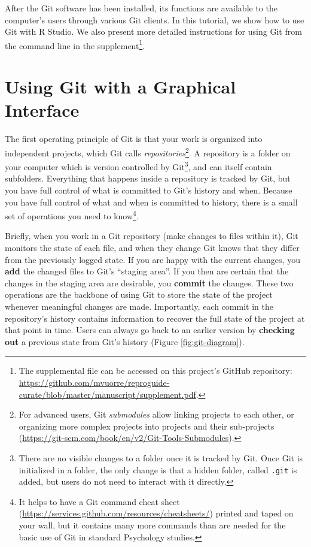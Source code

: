 \documentclass[
  american,
  ,doc,floatsintext]{apa6}
\begin{document}
After the Git software has been installed, its functions are available to the computer's users through various Git clients. In this tutorial, we show how to use Git with R Studio. We also present more detailed instructions for using Git from the command line in the supplement\footnote{The supplemental file can be accessed on this project's GitHub repository: \url{https://github.com/mvuorre/reproguide-curate/blob/master/manuscript/supplement.pdf}.}.

\hypertarget{using-git-with-a-graphical-interface}{%
\section{Using Git with a Graphical Interface}\label{using-git-with-a-graphical-interface}}

The first operating principle of Git is that your work is organized into independent projects, which Git calls \emph{repositories}\footnote{For advanced users, Git \emph{submodules} allow linking projects to each other, or organizing more complex projects into projects and their sub-projects (\url{https://git-scm.com/book/en/v2/Git-Tools-Submodules}).}. A repository is a folder on your computer which is version controlled by Git\footnote{There are no visible changes to a folder once it is tracked by Git. Once Git is initialized in a folder, the only change is that a hidden folder, called \texttt{.git} is added, but users do not need to interact with it directly.}, and can itself contain subfolders. Everything that happens inside a repository is tracked by Git, but you have full control of what is committed to Git's history and when. Because you have full control of what and when is committed to history, there is a small set of operations you need to know\footnote{It helps to have a Git command cheat sheet (\url{https://services.github.com/resources/cheatsheets/}) printed and taped on your wall, but it contains many more commands than are needed for the basic use of Git in standard Psychology studies.}.

Briefly, when you work in a Git repository (make changes to files within it), Git monitors the state of each file, and when they change Git knows that they differ from the previously logged state. If you are happy with the current changes, you \textbf{add} the changed files to Git's \enquote{staging area}. If you then are certain that the changes in the staging area are desirable, you \textbf{commit} the changes. These two operations are the backbone of using Git to store the state of the project whenever meaningful changes are made. Importantly, each commit in the repository's history contains information to recover the full state of the project at that point in time. Users can always go back to an earlier version by \textbf{checking out} a previous state from Git's history (Figure \ref{fig:git-diagram}).
\end{document}
